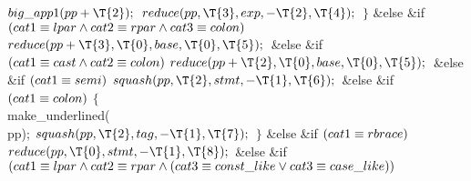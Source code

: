${}\\{big\_app1}(\\{pp}+\T{2});{}$\6
${}\\{reduce}(\\{pp},\39\T{3},\39\\{exp},\39{-}\T{2},\39\T{4});{}$\6
\4${}\}{}$\2\6
\&{else} \&{if} ${}(\\{cat1}\E\\{lpar}\W\\{cat2}\E\\{rpar}\W\\{cat3}\E%
\\{colon}){}$\1\5
${}\\{reduce}(\\{pp}+\T{3},\39\T{0},\39\\{base},\39\T{0},\39\T{5});{}$\2\6
\&{else} \&{if} ${}(\\{cat1}\equiv\\{cast}\land\\{cat2}\equiv\\{colon}){}$\1\5
${}\\{reduce}(\\{pp}+\T{2},\39\T{0},\39\\{base},\39\T{0},\39\T{5});{}$\2\6
\&{else} \&{if} ${}(\\{cat1}\equiv\\{semi}){}$\1\5
${}\\{squash}(\\{pp},\39\T{2},\39\\{stmt},\39{-}\T{1},\39\T{6});{}$\2\6
\&{else} \&{if} ${}(\\{cat1}\equiv\\{colon}){}$\5
${}\{{}$\1\6
\\{make\_underlined}(\\{pp});\6
${}\\{squash}(\\{pp},\39\T{2},\39\\{tag},\39{-}\T{1},\39\T{7});{}$\6
\4${}\}{}$\2\6
\&{else} \&{if} ${}(\\{cat1}\equiv\\{rbrace}){}$\1\5
${}\\{reduce}(\\{pp},\39\T{0},\39\\{stmt},\39{-}\T{1},\39\T{8});{}$\2\6
\&{else} \&{if} ${}(\\{cat1}\E\\{lpar}\W\\{cat2}\E\\{rpar}\W(\\{cat3}\E\\{const%
\_like}\V\\{cat3}\E\\{case\_like})){}$\5
